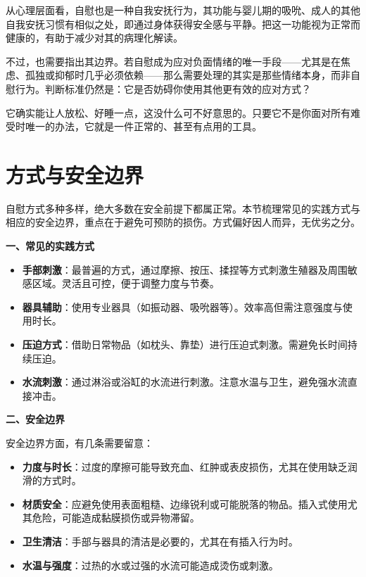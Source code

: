 \documentclass[12pt,UTF8]{ctexbook}
\begin{document}
从心理层面看，自慰也是一种自我安抚行为，其功能与婴儿期的吸吮、成人的其他自我安抚习惯有相似之处，即通过身体获得安全感与平静。把这一功能视为正常而健康的，有助于减少对其的病理化解读。

不过，也需要指出其边界。若自慰成为应对负面情绪的唯一手段——尤其是在焦虑、孤独或抑郁时几乎必须依赖——那么需要处理的其实是那些情绪本身，而非自慰行为。判断标准仍然是：它是否妨碍你使用其他更有效的应对方式？

\begin{tcolorbox}[colback=pink!5!white,colframe=red!50!black,title=贴心小叮咛]
它确实能让人放松、好睡一点，这没什么可不好意思的。只要它不是你面对所有难受时唯一的办法，它就是一件正常的、甚至有点用的工具。
\end{tcolorbox}

\section{方式与安全边界}

自慰方式多种多样，绝大多数在安全前提下都属正常。本节梳理常见的实践方式与相应的安全边界，重点在于避免可预防的损伤。方式偏好因人而异，无优劣之分。

\textbf{一、常见的实践方式}

\begin{itemize}
\item \textbf{手部刺激}：最普遍的方式，通过摩擦、按压、揉捏等方式刺激生殖器及周围敏感区域。灵活且可控，便于调整力度与节奏。
\item \textbf{器具辅助}：使用专业器具（如振动器、吸吮器等）。效率高但需注意强度与使用时长。
\item \textbf{压迫方式}：借助日常物品（如枕头、靠垫）进行压迫式刺激。需避免长时间持续压迫。
\item \textbf{水流刺激}：通过淋浴或浴缸的水流进行刺激。注意水温与卫生，避免强水流直接冲击。
\end{itemize}

\textbf{二、安全边界}

安全边界方面，有几条需要留意：

\begin{itemize}
\item \textbf{力度与时长}：过度的摩擦可能导致充血、红肿或表皮损伤，尤其在使用缺乏润滑的方式时。
\item \textbf{材质安全}：应避免使用表面粗糙、边缘锐利或可能脱落的物品。插入式使用尤其危险，可能造成黏膜损伤或异物滞留。
\item \textbf{卫生清洁}：手部与器具的清洁是必要的，尤其在有插入行为时。
\item \textbf{水温与强度}：过热的水或过强的水流可能造成烫伤或刺激。
\end{itemize}
\end{document}
